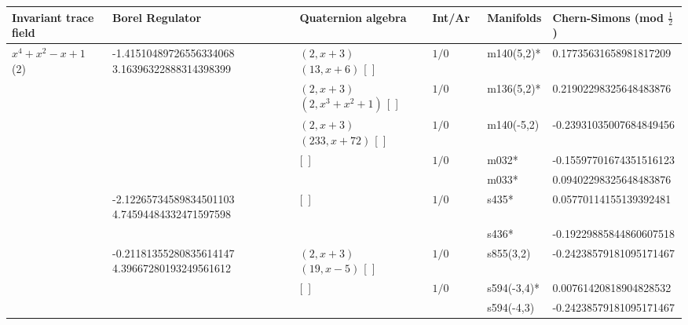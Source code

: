 \documentclass[a4paper]{amsart}
\newcommand{\PreserveBackslash}[1]{\let\temp =\\#1\let\\=\temp}
\theoremstyle{definition}
\begin{document}
\begin{sidewaystable}
\centering
\begin{tabular}{|>{\PreserveBackslash\raggedright}p{3.2cm}
|>{\PreserveBackslash\raggedright}p{4.2cm}
|>{\PreserveBackslash\raggedright}p{3.4cm}|l
|>{\PreserveBackslash\raggedright}p{2.0cm}
|>{\PreserveBackslash\raggedright}p{4.2cm}|}

\hline

Invariant trace field & Borel Regulator & Quaternion algebra &  Int/Ar\
& Manifolds &Chern-Simons (mod $\frac{1}{2}$) \\

\hline

\hbox{$x^4 + x^2 - x + 1 $} (2) &
-1.41510489726556334068 
3.16396322888314398399 &
$(2, x+3)$ ~$(13, x+6)$  [~]&
$1/0$ &
{m140(5,2)* }& 
0.17735631658981817209 \\

\cline{3-6}
 &
 &
$(2, x+3)$ ~$(2, x^3+x^2+1)$ [~]&
$1/0$ &
{m136(5,2)* }&
0.21902298325648483876 \\

\cline{3-6}
 &
 &
$(2, x+3)$ ~$(233, x+72)$ [~]&
$1/0$ &
{m140(-5,2) } &
-0.23931035007684849456 \\

\cline{3-6}
 &
 &
[~]&
$1/0$ &
{m032*} &
-0.15597701674351516123 \\

\cline{5-6}
 &
 &
&%
&%
{m033*} &
0.09402298325648483876 \\

\cline{2-6}
 &
-2.12265734589834501103 
4.74594484332471597598 &
[~]&
$1/0$ &
{s435*} &
0.05770114155139392481 \\
\cline{5-6}
 &
&%
&%
&%
{s436*} &
-0.19229885844860607518\\



\cline{2-6}
& %
-0.21181355280835614147 
4.39667280193249561612 &
$(2, x+3)$ ~$(19, x-5)$ [~]&
$1/0$ &
{s855(3,2)} &
-0.24238579181095171467 \\

\cline{3-6}
& %
&%
 [~]&
$1/0$ &
{s594(-3,4)* } &
0.00761420818904828532 \\
\cline{5-6}
& %
&%
&%
&%
{s594(-4,3) } &
-0.24238579181095171467 \\


\end{tabular}
\end{sidewaystable}
\end{document}
